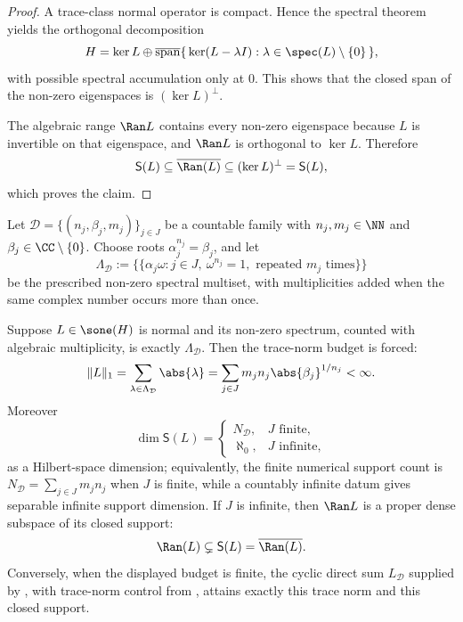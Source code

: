 \begin{proof}
  A trace-class normal operator is compact. Hence the spectral theorem
  yields the orthogonal decomposition
  \[
    H=\ker L\oplus
    \overline{\mathrm{span}}
    \{\,\ker(L-\lambda I):\lambda\in\spec(L)\setminus\{0\}\,\},
  \]
  with possible spectral accumulation only at \(0\). This shows that the
  closed span of the non-zero eigenspaces is \((\ker L)^\perp\).

  The algebraic range \(\Ran L\) contains every non-zero eigenspace because
  \(L\) is invertible on that eigenspace, and \(\Ran L\) is orthogonal to
  \(\ker L\).
  Therefore
  \[
    \mathsf S(L)\subseteq \overline{\Ran(L)}
    \subseteq (\ker L)^\perp=\mathsf S(L),
  \]
  which proves the claim.
\end{proof}

\begin{proposition}
  \label{prop:sharp-trace-budget-support-obstruction}
  Let \(\mathcal D=\{(n_j,\beta_j,m_j)\}_{j\in J}\) be a countable
  family with \(n_j,m_j\in\NN\) and
  \(\beta_j\in\CC\setminus\{0\}\). Choose roots
  \(\alpha_j^{n_j}=\beta_j\), and let
  \[
    \Lambda_{\mathcal D}
    :=
    \bigl\{\!\bigl\{\alpha_j\omega:
      j\in J,\ \omega^{n_j}=1,\text{ repeated }m_j\text{ times}
    \bigr\}\!\bigr\}
  \]
  be the prescribed non-zero spectral multiset, with multiplicities added
  when the same complex number occurs more than once.

  Suppose \(L\in\sone(H)\) is normal and its non-zero spectrum, counted
  with algebraic multiplicity, is exactly \(\Lambda_{\mathcal D}\). Then
  the trace-norm budget is forced:
  \[
    \|L\|_1
    =
    \sum_{\lambda\in\Lambda_{\mathcal D}}\abs{\lambda}
    =
    \sum_{j\in J}m_j n_j\abs{\beta_j}^{1/n_j}
    <\infty .
  \]
  Moreover
  \[
    \dim \mathsf S(L)=
    \begin{cases}
      N_{\mathcal D},& J\text{ finite},\\
      \aleph_0,& J\text{ infinite},
    \end{cases}
  \]
  as a Hilbert-space dimension; equivalently, the finite numerical support
  count is \(N_{\mathcal D}=\sum_{j\in J}m_jn_j\) when \(J\) is finite,
  while a countably infinite datum gives separable infinite support
  dimension. If \(J\) is infinite, then \(\Ran L\) is a proper
  dense subspace of its closed support:
  \[
    \Ran(L)\subsetneq \mathsf S(L)
    =\overline{\Ran(L)} .
  \]
  Conversely, when the displayed budget is finite, the cyclic direct sum
  \(L_{\mathcal D}\) supplied by
  , with trace-norm control
  from , attains exactly this
  trace norm and this closed support.
\end{proposition}


